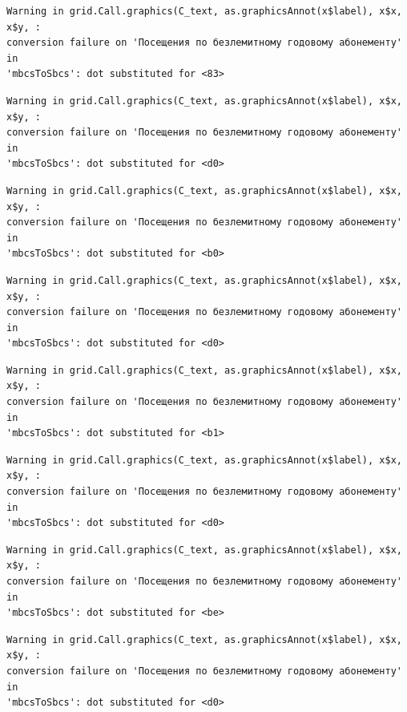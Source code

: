 \documentclass[
  letterpaper,
  DIV=11,
  numbers=noendperiod]{scrartcl}
\begin{document}
\begin{verbatim}
Warning in grid.Call.graphics(C_text, as.graphicsAnnot(x$label), x$x, x$y, :
conversion failure on 'Посещения по безлемитному годовому абонементу' in
'mbcsToSbcs': dot substituted for <83>
\end{verbatim}

\begin{verbatim}
Warning in grid.Call.graphics(C_text, as.graphicsAnnot(x$label), x$x, x$y, :
conversion failure on 'Посещения по безлемитному годовому абонементу' in
'mbcsToSbcs': dot substituted for <d0>
\end{verbatim}

\begin{verbatim}
Warning in grid.Call.graphics(C_text, as.graphicsAnnot(x$label), x$x, x$y, :
conversion failure on 'Посещения по безлемитному годовому абонементу' in
'mbcsToSbcs': dot substituted for <b0>
\end{verbatim}

\begin{verbatim}
Warning in grid.Call.graphics(C_text, as.graphicsAnnot(x$label), x$x, x$y, :
conversion failure on 'Посещения по безлемитному годовому абонементу' in
'mbcsToSbcs': dot substituted for <d0>
\end{verbatim}

\begin{verbatim}
Warning in grid.Call.graphics(C_text, as.graphicsAnnot(x$label), x$x, x$y, :
conversion failure on 'Посещения по безлемитному годовому абонементу' in
'mbcsToSbcs': dot substituted for <b1>
\end{verbatim}

\begin{verbatim}
Warning in grid.Call.graphics(C_text, as.graphicsAnnot(x$label), x$x, x$y, :
conversion failure on 'Посещения по безлемитному годовому абонементу' in
'mbcsToSbcs': dot substituted for <d0>
\end{verbatim}

\begin{verbatim}
Warning in grid.Call.graphics(C_text, as.graphicsAnnot(x$label), x$x, x$y, :
conversion failure on 'Посещения по безлемитному годовому абонементу' in
'mbcsToSbcs': dot substituted for <be>
\end{verbatim}

\begin{verbatim}
Warning in grid.Call.graphics(C_text, as.graphicsAnnot(x$label), x$x, x$y, :
conversion failure on 'Посещения по безлемитному годовому абонементу' in
'mbcsToSbcs': dot substituted for <d0>
\end{verbatim}
\end{document}
